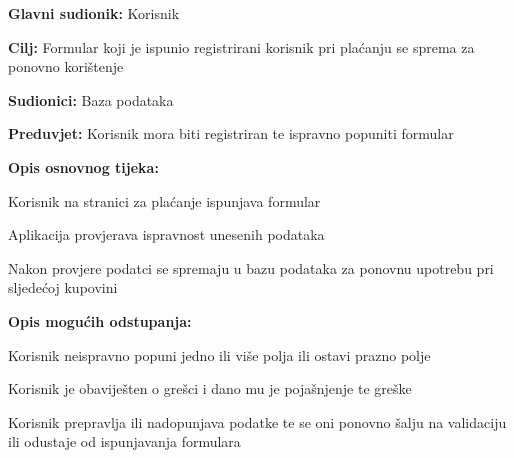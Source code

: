 				
				\noindent {}
				\begin{packed_item}
					
					\item \textbf{Glavni sudionik: }Korisnik
					\item  \textbf{Cilj:} Formular koji je ispunio registrirani korisnik pri plaćanju se sprema za ponovno korištenje
					\item  \textbf{Sudionici:} Baza podataka
					\item  \textbf{Preduvjet:} Korisnik mora biti registriran te ispravno popuniti formular
					\item  \textbf{Opis osnovnog tijeka:}
					
					\item[] \begin{packed_enum}
						
						\item Korisnik na stranici za plaćanje ispunjava formular
						\item Aplikacija provjerava ispravnost unesenih podataka
						\item Nakon provjere podatci se spremaju u bazu podataka za ponovnu upotrebu pri sljedećoj kupovini
					\end{packed_enum}
				
					\item  \textbf{Opis mogućih odstupanja:}
					
					\item[] \begin{packed_item}
						
						\item[2.a] Korisnik neispravno popuni jedno ili više polja ili ostavi prazno polje
						\item[] \begin{packed_enum}
							
							\item Korisnik je obaviješten o grešci i dano mu je pojašnjenje te greške
							\item Korisnik prepravlja ili nadopunjava podatke te se oni ponovno šalju na validaciju ili odustaje od ispunjavanja formulara
							
						\end{packed_enum}	
					\end{packed_item}
				\end{packed_item}
			
